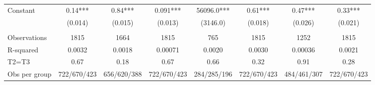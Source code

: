 \begin{tabular}{lccccccc}
Constant  & 0.14*** & 0.84*** & 0.091*** & 56096.0*** & 0.61*** & 0.47*** & 0.33*** \\
      & (0.014) & (0.015) & (0.013) & (3146.0) & (0.018) & (0.026) & (0.021) \\
      &       &       &       &       &       &       &  \\
\midrule
Observations & 1815  & 1664  & 1815  & 765   & 1815  & 1252  & 1815 \\
R-squared & 0.0032 & 0.0018 & 0.00071 & 0.0020 & 0.0030 & 0.00036 & 0.0021 \\
T2=T3 & 0.67  & 0.18  & 0.67  & 0.66  & 0.32  & 0.91  & 0.28 \\
Obs per group & 722/670/423 & 656/620/388 & 722/670/423 & 284/285/196 & 722/670/423 & 484/461/307 & 722/670/423 \\
\bottomrule
\bottomrule
\end{tabular}%
